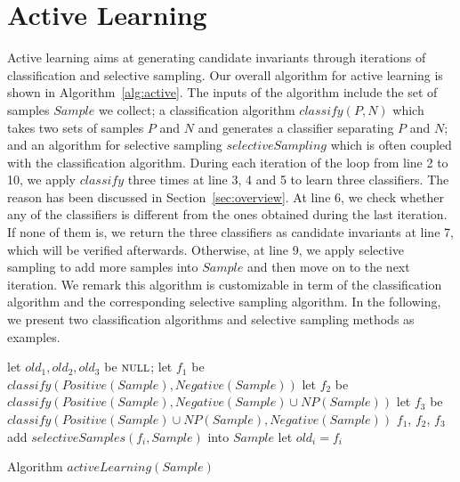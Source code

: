 
\section{Active Learning} %
\label{sec:learning}
Active learning aims at generating candidate invariants through iterations of classification and selective sampling. Our overall algorithm for active learning is shown in Algorithm~\ref{alg:active}. The inputs of the algorithm include the set of samples $\mathit{Sample}$ we collect; a classification algorithm $\mathit{classify}(P,N)$ which takes two sets of samples $P$ and $N$ and generates a classifier separating $P$ and $N$; and an algorithm for selective sampling $\mathit{selectiveSampling}$ which is often coupled with the classification algorithm. During each iteration of the loop from line 2 to 10, we apply $\mathit{classify}$ three times at line 3, 4 and 5 to learn three classifiers. The reason has been discussed in Section~\ref{sec:overview}. At line 6, we check whether any of the classifiers is different from the ones obtained during the last iteration. If none of them is, we return the three classifiers as candidate invariants at line 7, which will be verified afterwards. Otherwise, at line 9, we apply selective sampling to add more samples into $\mathit{Sample}$ and then move on to the next iteration. We remark this algorithm is customizable in term of the classification algorithm and the corresponding selective sampling algorithm. In the following, we present two classification algorithms and selective sampling methods as examples.

\begin{algorithm}[t]
\SetAlgoVlined
\Indm
\Indp
let $\mathit{old_1}, \mathit{old_2}, \mathit{old_3}$ be $\textsc{null}$;\;
 {
    let $f_1$ be $\mathit{classify}(\mathit{Positive}(\mathit{Sample}), \mathit{Negative}(\mathit{Sample}))$\;
    let $f_2$ be $\mathit{classify}(\mathit{Positive}(\mathit{Sample}), \mathit{Negative}(\mathit{Sample}) \cup \mathit{NP}(\mathit{Sample}))$\;
    let $f_3$ be $\mathit{classify}(\mathit{Positive}(\mathit{Sample}) \cup \mathit{NP}(\mathit{Sample}), \mathit{Negative}(\mathit{Sample}))$\;
     {
        \Return $f_1$, $f_2$, $f_3$\;
    }
     {
        add $\mathit{selectiveSamples}(f_i, \mathit{Sample})$ into $\mathit{Sample}$\;
        let $\mathit{old_i} = f_i$\;
    }
}
\caption{Algorithm $\mathit{activeLearning}(\mathit{Sample})$}
\label{alg:active}
\end{algorithm}

